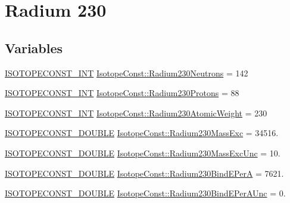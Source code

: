 \hypertarget{group___isotope_const-_radium-_ra230}{}\section{Radium 230}
\label{group___isotope_const-_radium-_ra230}
\subsection*{Variables}
\begin{DoxyCompactItemize}
\item 
\mbox{\hyperlink{group___isotope_const-_macros_ga5f18360b3e99483a35c32d789e62621c}{I\+S\+O\+T\+O\+P\+E\+C\+O\+N\+S\+T\+\_\+\+I\+NT}} \mbox{\hyperlink{group___isotope_const-_radium-_ra230_ga149ea5a163f44173d4a7c3643fe4dbc2}{Isotope\+Const\+::\+Radium230\+Neutrons}} = 142
\item 
\mbox{\hyperlink{group___isotope_const-_macros_ga5f18360b3e99483a35c32d789e62621c}{I\+S\+O\+T\+O\+P\+E\+C\+O\+N\+S\+T\+\_\+\+I\+NT}} \mbox{\hyperlink{group___isotope_const-_radium-_ra230_ga3c9dce9a67f2d40699e4c387e2ace47d}{Isotope\+Const\+::\+Radium230\+Protons}} = 88
\item 
\mbox{\hyperlink{group___isotope_const-_macros_ga5f18360b3e99483a35c32d789e62621c}{I\+S\+O\+T\+O\+P\+E\+C\+O\+N\+S\+T\+\_\+\+I\+NT}} \mbox{\hyperlink{group___isotope_const-_radium-_ra230_gabf6cea6479150dc37717c2d207b83ef4}{Isotope\+Const\+::\+Radium230\+Atomic\+Weight}} = 230
\item 
\mbox{\hyperlink{group___isotope_const-_macros_ga8f45a7272ce02c0b4c65c44636ed719a}{I\+S\+O\+T\+O\+P\+E\+C\+O\+N\+S\+T\+\_\+\+D\+O\+U\+B\+LE}} \mbox{\hyperlink{group___isotope_const-_radium-_ra230_gae24ce4a894f956c35f1fc761cb56ca8d}{Isotope\+Const\+::\+Radium230\+Mass\+Exc}} = 34516.
\item 
\mbox{\hyperlink{group___isotope_const-_macros_ga8f45a7272ce02c0b4c65c44636ed719a}{I\+S\+O\+T\+O\+P\+E\+C\+O\+N\+S\+T\+\_\+\+D\+O\+U\+B\+LE}} \mbox{\hyperlink{group___isotope_const-_radium-_ra230_ga640f42b4c6a430ed368ffe18193336a7}{Isotope\+Const\+::\+Radium230\+Mass\+Exc\+Unc}} = 10.
\item 
\mbox{\hyperlink{group___isotope_const-_macros_ga8f45a7272ce02c0b4c65c44636ed719a}{I\+S\+O\+T\+O\+P\+E\+C\+O\+N\+S\+T\+\_\+\+D\+O\+U\+B\+LE}} \mbox{\hyperlink{group___isotope_const-_radium-_ra230_gafb0467b2f66e071cc6f654393f362765}{Isotope\+Const\+::\+Radium230\+Bind\+E\+PerA}} = 7621.
\item 
\mbox{\hyperlink{group___isotope_const-_macros_ga8f45a7272ce02c0b4c65c44636ed719a}{I\+S\+O\+T\+O\+P\+E\+C\+O\+N\+S\+T\+\_\+\+D\+O\+U\+B\+LE}} \mbox{\hyperlink{group___isotope_const-_radium-_ra230_gace66cd9dc3aa44e28b2601a56e5749ad}{Isotope\+Const\+::\+Radium230\+Bind\+E\+Per\+A\+Unc}} = 0.

\end{DoxyCompactItemize}
